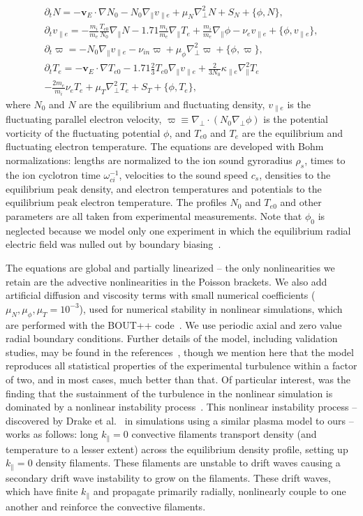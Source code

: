 \documentclass[showpacs,preprintnumbers,amsmath,amssymb,superscriptaddress,aip]{revtex4-1}
\def\beqar{\begin{eqnarray}}
\def\eeqar{\end{eqnarray}}
\def\para{\parallel}
\newcommand{\pdt}{\partial_t}
\def\grad{\nabla}
\newcommand{\gradpar}{\grad_\parallel}
\newcommand{\gradperp}{\grad_\perp}
\newcommand{\vpe}{v_{\parallel e}}
\newcommand{\nue}{\nu_{e}}
\newcommand{\nuin}{\nu_{in}}
\newcommand{\kpe}{\kappa_{\parallel e}}
\newcommand{\fmie}{\frac{m_i}{m_e}}
\begin{document}
\beqar
\label{ni_eq}
\pdt N = - {\mathbf v_E} \cdot \grad N_0 - N_0 \gradpar \vpe + \mu_N \gradperp^2 N + S_N + \{\phi,N\}, \\
\label{ve_eq}
\pdt \vpe = - \fmie \frac{T_{e0}}{N_0} \gradpar N - 1.71 \fmie \gradpar T_e  + \fmie \gradpar \phi - \nue \vpe + \{\phi,\vpe \}, \\
\label{rho_eq}
\pdt \varpi = - N_0 \gradpar \vpe  - \nuin \varpi + \mu_\phi \gradperp^2 \varpi + \{\phi,\varpi \}, \\
\label{te_eq}
\pdt T_e = - {\mathbf v_E} \cdot \grad T_{e0} - 1.71 \frac{2}{3} T_{e0} \gradpar \vpe + \frac{2}{3 N_0} \kpe \gradpar^2 T_e  \nonumber \\
- \frac{2 m_e}{m_i} \nue T_e  + \mu_T \gradperp^2 T_e +  S_T + \{\phi,T_e\},
\eeqar
where $N_0$ and $N$ are the equilibrium and fluctuating density, $\vpe$ is the fluctuating parallel electron velocity, $\varpi \equiv \gradperp \cdot (N_0 \gradperp \phi)$ is the potential vorticity
of the fluctuating potential $\phi$, and $T_{e0}$ and $T_e$ are the equilibrium and fluctuating electron temperature. The equations are developed with Bohm normalizations: lengths are
normalized to the ion sound gyroradius $\rho_s$, times to the ion cyclotron time $\omega_{ci}^{-1}$, velocities to the sound speed $c_s$, densities to the equilibrium peak density, and electron
temperatures and potentials to the equilibrium peak electron temperature. The profiles $N_0$ and $T_{e0}$ and other parameters are all taken from experimental measurements. Note that $\phi_0$ is
neglected because we model only one experiment in which the equilibrium radial electric field was nulled out by boundary biasing~\cite{schaffner2012}. 

The equations are global and partially linearized -- the only nonlinearities we retain are the advective nonlinearities in the Poisson brackets. 
We also add artificial diffusion and viscosity terms with small numerical coefficients ($\mu_N, \mu_\phi, \mu_T = 10^{-3}$), 
used for numerical stability in nonlinear simulations, which are performed with the BOUT++ code~\cite{dudson2009}. We use periodic axial and zero value radial 
boundary conditions. Further details of the model, including validation studies, may be found in the references~\cite{Popovich2010a,Popovich2010b,Umansky2011,friedman2012,friedman2012b},
though we mention here that the model reproduces all statistical properties of the experimental turbulence within a factor of two, and in most cases, much better than that.
Of particular interest, was the finding that the sustainment of the turbulence in the nonlinear simulation is dominated by a nonlinear instability process~\cite{friedman2012,friedman2012b}.
This nonlinear instability process -- discovered by Drake et al.~\cite{drake1995} in simulations using a similar plasma model to ours -- works as follows: long $k_\para=0$ convective filaments transport
density (and temperature to a lesser extent) across the equilibrium density profile, setting up $k_\para=0$ density filaments. These filaments are unstable to drift waves causing a secondary drift
wave instability to grow on the filaments. These drift waves, which have finite $k_\para$ and propagate primarily radially, nonlinearly couple to one another and reinforce the convective filaments.
\end{document}
